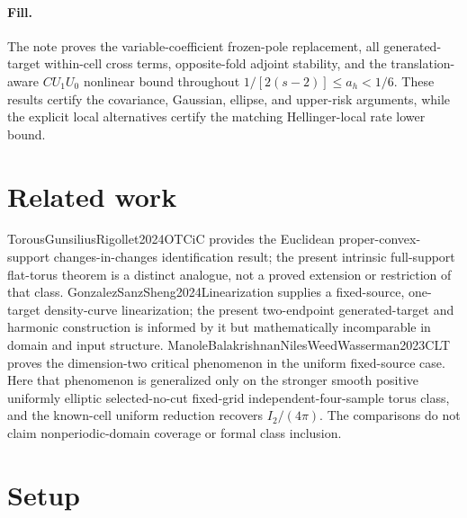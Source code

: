 \documentclass{article}
\begin{document}
\paragraph{Fill.} The note proves the variable-coefficient frozen-pole replacement, all generated-target within-cell cross terms, opposite-fold adjoint stability, and the translation-aware \(C U_1U_0\) nonlinear bound throughout \(1/[2(s-2)]\leq a_h<1/6\).  These results certify the covariance, Gaussian, ellipse, and upper-risk arguments, while the explicit local alternatives certify the matching Hellinger-local rate lower bound.

\section{Related work}

TorousGunsiliusRigollet2024OTCiC provides the Euclidean proper-convex-support changes-in-changes identification result; the present intrinsic full-support flat-torus theorem is a distinct analogue, not a proved extension or restriction of that class.  GonzalezSanzSheng2024Linearization supplies a fixed-source, one-target density-curve linearization; the present two-endpoint generated-target and harmonic construction is informed by it but mathematically incomparable in domain and input structure.  ManoleBalakrishnanNilesWeedWasserman2023CLT proves the dimension-two critical phenomenon in the uniform fixed-source case.  Here that phenomenon is generalized only on the stronger smooth positive uniformly elliptic selected-no-cut fixed-grid independent-four-sample torus class, and the known-cell uniform reduction recovers \(I_2/(4\pi)\).  The comparisons do not claim nonperiodic-domain coverage or formal class inclusion.

\section{Setup}
\end{document}
